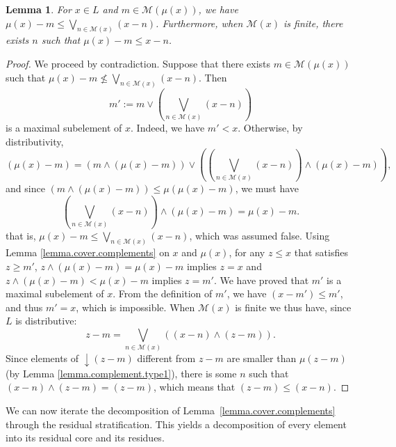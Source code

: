 \documentclass{article}
\newtheorem{lemma}[theorem]{Lemma}
\begin{document}

\begin{lemma}\label{lemma.surface.tree}
    For $x \in L$ and $m \in \mathcal{M}(\mu(x))$, we have $\mu(x) - m \le \underset{n \in \mathcal{M}(x)}{\bigvee} (x-n)$. Furthermore, when $\mathcal{M}(x)$ is finite, there exists $n$ such that $\mu(x)-m \le x-n$.
\end{lemma}

\begin{proof}
    We proceed by contradiction. Suppose that there exists $m \in \mathcal{M}(\mu(x))$ 
    such that $\mu(x) - m \not \le \underset{n \in \mathcal{M}(x)}{\bigvee} (x-n)$.
    Then 
    \[m':= m \vee \left( \underset{n \in \mathcal{M}(x)}{\bigvee} (x-n)\right)\] is a maximal subelement of $x$.
    Indeed, we have $m' < x$. Otherwise, by distributivity, \[(\mu(x)-m) = (m \wedge (\mu(x)-m)) \vee \left( \left(\underset{n \in \mathcal{M}(x)}{\bigvee} (x-n)\right) \wedge (\mu(x)-m)\right),\]
    and since $(m \wedge (\mu(x)-m)) \le \mu(\mu(x)-m)$, we must have 
    \[\left(\underset{n \in \mathcal{M}(x)}{\bigvee} (x-n)\right) \wedge (\mu(x)-m) = \mu(x)-m.\]
    that is, $\mu(x)-m \le \bigvee_{n \in \mathcal{M}(x)} (x-n)$, which was assumed false. Using Lemma \ref{lemma.cover.complements} on $x$ and $\mu(x)$, for any $z \le x$ that satisfies $z \ge m'$, $z \wedge (\mu(x)-m) = \mu(x)-m$ implies $z =x$ and $z \wedge (\mu(x)-m) < \mu(x)-m$ implies $z= m'$. We have proved that $m'$ is a maximal subelement of $x$. From the definition of $m'$, we have $(x-m') \le m'$, and thus $m' = x$, which is impossible.  
    When $\mathcal{M}(x)$ is finite we thus have, since $L$ is distributive: 
    \[z-m = \underset{n \in \mathcal{M}(x)}{\bigvee} ((x-n) \wedge (z-m)).\]
    Since elements of $\mathop{\downarrow}(z-m)$ different from $z-m$ are smaller than $\mu(z-m)$ (by Lemma \ref{lemma.complement.type1}), there is some $n$ such that $(x-n) \wedge (z-m) = (z-m)$, which means that $(z-m) \le (x-n)$.
\end{proof}

{We can now iterate the decomposition of Lemma~\ref{lemma.cover.complements} through the residual stratification. This yields a decomposition of every element into its residual core and its residues.}
\end{document}

